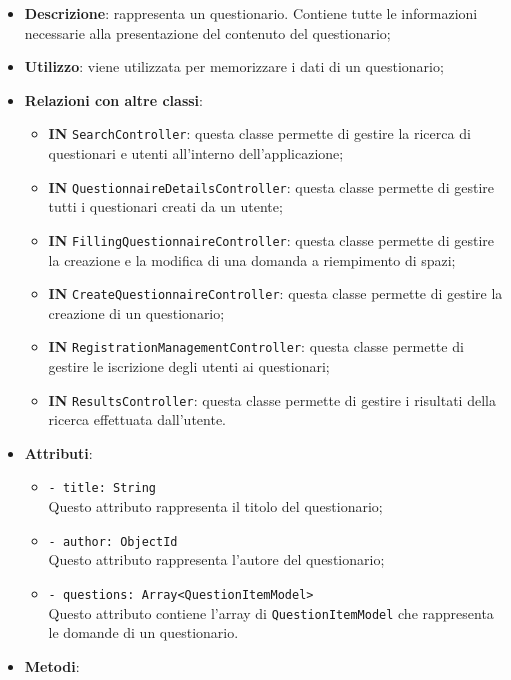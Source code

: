 		\begin{itemize}
			\item \textbf{Descrizione}: rappresenta un questionario. Contiene tutte le informazioni necessarie alla presentazione del contenuto del questionario;
			\item \textbf{Utilizzo}: viene utilizzata per memorizzare i dati di un questionario;
			\item \textbf{Relazioni con altre classi}: 
			\begin{itemize}
				\item \textbf{IN} \texttt{SearchController}: questa classe permette di gestire la ricerca di questionari e utenti all'interno dell'applicazione;
				\item \textbf{IN} \texttt{QuestionnaireDetailsController}: questa classe permette di gestire tutti i questionari creati da un utente; 
				\item \textbf{IN} \texttt{FillingQuestionnaireController}: questa classe permette di gestire la creazione e la modifica di una domanda a riempimento di spazi;
				\item \textbf{IN} \texttt{CreateQuestionnaireController}: questa classe permette di gestire la creazione di un questionario;
				\item \textbf{IN} \texttt{RegistrationManagementController}: questa classe permette di gestire le iscrizione degli utenti ai questionari;
				\item \textbf{IN} \texttt{ResultsController}: questa classe permette di gestire i risultati della ricerca effettuata dall'utente.
			\end{itemize}
			\item \textbf{Attributi}: 
			\begin{itemize}
				\item \texttt{- title: String}\\
				Questo attributo rappresenta il titolo del questionario;
				\item \texttt{- author: ObjectId}\\
				Questo attributo rappresenta l'autore del questionario;
				\item \texttt{- questions: Array<QuestionItemModel>}\\
				Questo attributo contiene l'array di \texttt{QuestionItemModel} che rappresenta le domande di un questionario.
			\end{itemize}
			\item \textbf{Metodi}: 
			\begin{itemize}

\end{itemize}
\end{itemize}
